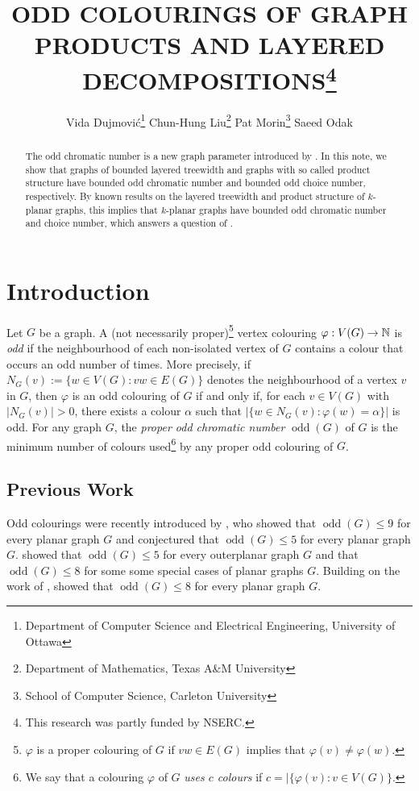 \documentclass{patmorin}
\title{\MakeUppercase{Odd Colourings of Graph Products and Layered Decompositions}\thanks{This research was partly funded by NSERC.}}
\author{%
  Vida Dujmović\thanks{Department of Computer Science and Electrical Engineering, University of Ottawa}\qquad
  Chun-Hung Liu\thanks{Department of Mathematics, Texas A\&M University}\qquad
  Pat Morin\thanks{School of Computer Science, Carleton University}\qquad
  Saeed Odak\footnotemark[2]
}
\date{}
\DeclareMathOperator{\odd}{odd}
\begin{document}
\maketitle

\begin{abstract}
  The odd chromatic number is a new graph parameter introduced by \citet{petrusevski.skrekovski:colorings}.  In this note, we show that graphs of bounded layered treewidth and graphs with so called product structure have bounded odd chromatic number and bounded odd choice number, respectively. By known results on the layered treewidth and product structure of $k$-planar graphs, this implies that $k$-planar graphs have bounded odd chromatic number and choice number, which answers a question of \citet{cranston.lafferty.ea:note}.
\end{abstract}

%

\section{Introduction}

Let $G$ be a graph.  A (not necessarily proper)\footnote{$\varphi$ is a proper colouring of $G$ if $vw\in E(G)$ implies that $\varphi(v)\neq\varphi(w)$.} vertex colouring $\varphi:V(G)\to\mathbb{N}$ is \emph{odd} if the neighbourhood of each non-isolated vertex of $G$ contains a colour that occurs an odd number of times. More precisely, if $N_G(v):=\{w\in V(G):vw\in E(G)\}$ denotes the neighbourhood of a vertex $v$ in $G$, then $\varphi$ is an odd colouring of $G$ if and only if, for each $v\in V(G)$ with $|N_G(v)|>0$, there exists a colour $\alpha$ such that $|\{w\in N_G(v): \varphi(w)=\alpha\}|$ is odd.  For any graph $G$, the \emph{proper odd chromatic number} $\odd(G)$ of $G$ is the minimum number of colours used\footnote{We say that a colouring $\varphi$ of $G$ \emph{uses $c$ colours} if $c=|\{\varphi(v):v\in V(G)\}$.} by any proper odd colouring of $G$.

\subsection{Previous Work}

Odd colourings were recently introduced by \citet{petrusevski.skrekovski:colorings}, who showed that $\odd(G)\le 9$ for every planar graph $G$ and conjectured that $\odd(G)\le 5$ for every planar graph $G$. \citet{caro.petrusevski.ea:remarks} showed that $\odd(G)\le 5$ for every outerplanar graph $G$ and that $\odd(G)\le 8$ for some some special cases of planar graphs $G$.    Building on the work of \citet{caro.petrusevski.ea:remarks}, \citet{petr.portier:odd} showed that $\odd(G)\le 8$ for every planar graph $G$.
\end{document}
